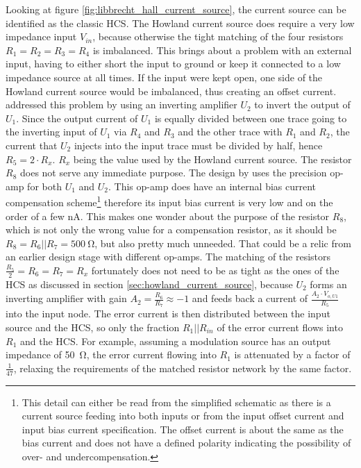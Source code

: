 Looking at figure \ref{fig:libbrecht_hall_current_source}, the current source can be identified as the classic HCS. The Howland current source does require a very low impedance input $V_{in}$, because otherwise the tight matching of the four resistors $R_1 = R_2 = R_3 = R_4$ is imbalanced. This brings about a problem with an external input, having to either short the input to ground or keep it connected to a low impedance source at all times. If the input were kept open, one side of the Howland current source would be imbalanced, thus creating an offset current. \citeauthor{libbrecht_hall} \cite{libbrecht_hall} addressed this problem by using an inverting amplifier $U_2$ to invert the output of $U_1$. Since the output current of $U_1$ is equally divided between one trace going to the inverting input of $U_1$ via $R_4$ and $R_3$ and the other trace with $R_1$ and $R_2$, the current that $U_2$ injects into the input trace must be divided by half, hence $R_5 = 2 \cdot R_x$. $R_x$ being the value used by the Howland current source. The resistor $R_8$ does not serve any immediate purpose. The design by \citeauthor{libbrecht_hall} uses the  \cite{datasheet_OP07} precision op-amp for both $U_1$ and $U_2$. This op-amp does have an internal bias current compensation scheme\footnote{This detail can either be read from the simplified schematic as there is a current source feeding into both inputs or from the input offset current and input bias current specification. The offset current is about the same as the bias current and does not have a defined polarity indicating the possibility of over- and undercompensation.} therefore its input bias current is very low and on the order of a few \unit{\nA}. This makes one wonder about the purpose of the resistor $R_8$, which is not only the wrong value for a compensation resistor, as it should be $R_8 = R_6 || R_7 = \qty{500}{\ohm}$, but also pretty much unneeded. That could be a relic from an earlier design stage with different op-amps. The matching of the resistors $\frac{R_5}{2} = R_6 = R_7 = R_x$ fortunately does not need to be as tight as the ones of the HCS as discussed in section \ref{sec:howland_current_source}, because $U_2$ forms an inverting amplifier with gain $A_2 = \frac{R_6}{R_7} \approx -1$ and feeds back a current of $\frac{A_2 \cdot V_{o,U1}}{R_5}$ into the input node. The error current is then distributed between the input source and the HCS, so only the fraction $R_1 || R_{in}$ of the error current flows into $R_1$ and the HCS. For example, assuming a modulation source has an output impedance of \qty{50}{\ohm}, the error current flowing into $R_1$ is attenuated by a factor of $\frac{1}{47}$, relaxing the requirements of the matched resistor network by the same factor.

